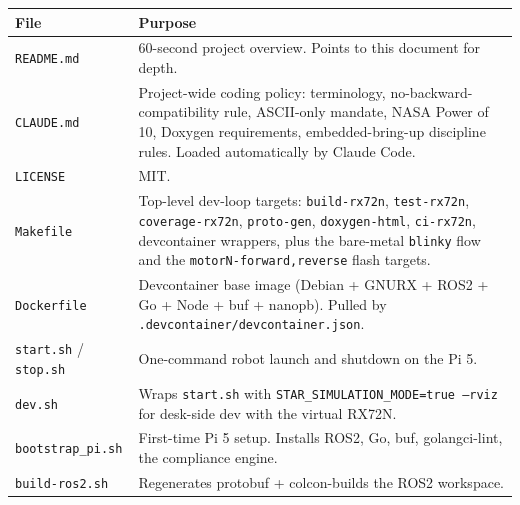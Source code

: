 \begin{center}
\begin{tabular}{|p{4.0cm}|p{10.5cm}|}
\hline
\textbf{File}                          & \textbf{Purpose}                                                                                                                              \\
\hline
\texttt{README.md}                     & 60-second project overview. Points to this document for depth.                                                                                  \\
\texttt{CLAUDE.md}                     & Project-wide coding policy: terminology, no-backward-compatibility rule, ASCII-only mandate, NASA Power of 10, Doxygen requirements, embedded-bring-up discipline rules. Loaded automatically by Claude Code. \\
\texttt{LICENSE}                       & MIT.                                                                                                                                            \\
\texttt{Makefile}                      & Top-level dev-loop targets: \texttt{build-rx72n}, \texttt{test-rx72n}, \texttt{coverage-rx72n}, \texttt{proto-gen}, \texttt{doxygen-html}, \texttt{ci-rx72n}, devcontainer wrappers, plus the bare-metal \texttt{blinky} flow and the \texttt{motorN-{forward,reverse}} flash targets. \\
\texttt{Dockerfile}                    & Devcontainer base image (Debian + GNURX + ROS2 + Go + Node + buf + nanopb). Pulled by \texttt{.devcontainer/devcontainer.json}.                  \\
\texttt{start.sh} / \texttt{stop.sh}   & One-command robot launch and shutdown on the Pi 5.                                                                                              \\
\texttt{dev.sh}                        & Wraps \texttt{start.sh} with \texttt{STAR\_SIMULATION\_MODE=true --rviz} for desk-side dev with the virtual RX72N.                              \\
\texttt{bootstrap\_pi.sh}              & First-time Pi 5 setup. Installs ROS2, Go, buf, golangci-lint, the compliance engine.                                                            \\
\texttt{build-ros2.sh}                 & Regenerates protobuf + colcon-builds the ROS2 workspace.                                                                                        \\

\end{tabular}
\end{center}
